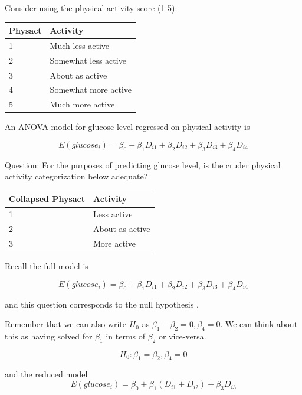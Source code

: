 \documentclass[
  letterpaper,
  DIV=11,
  numbers=noendperiod]{scrreport}
\begin{document}
Consider using the physical activity score (1-5):

\begin{longtable}[]{@{}ll@{}}
\toprule()
Physact & Activity \\
\midrule()
\endhead
1 & Much less active \\
2 & Somewhat less active \\
3 & About as active \\
4 & Somewhat more active \\
5 & Much more active \\
\bottomrule()
\end{longtable}

An ANOVA model for glucose level regressed on physical activity is

\[E(glucose_i) = \beta_0 + \beta_1D_{i1} + \beta_2D_{i2} + \beta_3D_{i3} + \beta_4 D_{i4}\]

Question: For the purposes of predicting glucose level, is the cruder
physical activity categorization below adequate?

\begin{longtable}[]{@{}ll@{}}
\toprule()
Collapsed Physact & Activity \\
\midrule()
\endhead
1 & Less active \\
2 & About as active \\
3 & More active \\
\bottomrule()
\end{longtable}

Recall the full model is

\[E(glucose_i) = \beta_0 + \beta_1D_{i1} + \beta_2D_{i2} + \beta_3D_{i3} + \beta_4 D_{i4}\]

and this question corresponds to the null hypothesis .

Remember that we can also write \(H_0\) as
\(\beta_1 - \beta_2 = 0, \beta_4 = 0\). We can think about this as
having solved for \(\beta_1\) in terms of \(\beta_2\) or vice-versa.

\[H_0: \beta_1 = \beta_2, \beta_4 = 0\]

and the reduced model
\[E(glucose_i) = \beta_0 + \beta_1(D_{i1} + D_{i2}) + \beta_3D_{i3}\]
\end{document}
